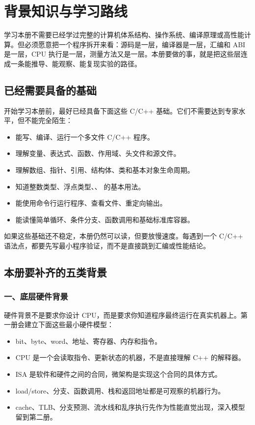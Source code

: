 \chapter*{背景知识与学习路线}

学习本册不需要已经学过完整的计算机体系结构、操作系统、编译原理或高性能计算。但必须愿意把一个程序拆开来看：源码是一层，编译器是一层，汇编和 ABI 是一层，CPU 执行是一层，测量方法又是一层。本册要做的事，就是把这些层连成一条能推导、能观察、能复现实验的路径。

\section*{已经需要具备的基础}

开始学习本册前，最好已经具备下面这些 C/C++ 基础。它们不需要达到专家水平，但不能完全陌生：

\begin{itemize}
  \item 能写、编译、运行一个多文件 C/C++ 程序。
  \item 理解变量、表达式、函数、作用域、头文件和源文件。
  \item 理解数组、指针、引用、结构体、类和基本对象生命周期。
  \item 知道整数类型、浮点类型、、 的基本用法。
  \item 能使用命令行运行程序、查看文件、重定向输出。
  \item 能读懂简单循环、条件分支、函数调用和基础标准库容器。
\end{itemize}

如果这些基础还不稳定，本册仍然可以读，但要放慢速度。每遇到一个 C/C++ 语法点，都要先写最小程序验证，而不是直接跳到汇编或性能结论。

\section*{本册要补齐的五类背景}

\subsection*{一、底层硬件背景}

硬件背景不是要求你设计 CPU，而是要求你知道程序最终运行在真实机器上。第一册会建立下面这些最小硬件模型：

\begin{itemize}
  \item bit、byte、word、地址、寄存器、内存和指令。
  \item CPU 是一个会读取指令、更新状态的机器，不是直接理解 C++ 的解释器。
  \item ISA 是软件和硬件之间的合同，微架构是实现这个合同的具体方式。
  \item load/store、分支、函数调用、栈和返回地址都是可观察的机器行为。
  \item cache、TLB、分支预测、流水线和乱序执行先作为性能直觉出现，深入模型留到第二册。
\end{itemize}

